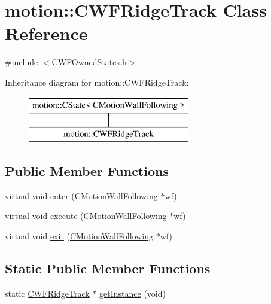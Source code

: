 \hypertarget{classmotion_1_1CWFRidgeTrack}{}\section{motion\+:\+:C\+W\+F\+Ridge\+Track Class Reference}
\label{classmotion_1_1CWFRidgeTrack}


{\ttfamily \#include $<$C\+W\+F\+Owned\+States.\+h$>$}

Inheritance diagram for motion\+:\+:C\+W\+F\+Ridge\+Track\+:\begin{figure}[H]
\begin{center}
\leavevmode
\includegraphics[height=2.000000cm]{classmotion_1_1CWFRidgeTrack}
\end{center}
\end{figure}
\subsection*{Public Member Functions}
\begin{DoxyCompactItemize}
\item 
virtual void \mbox{\hyperlink{classmotion_1_1CWFRidgeTrack_a216b8b7778464a2afd1a4f57da4317de}{enter}} (\mbox{\hyperlink{classmotion_1_1CMotionWallFollowing}{C\+Motion\+Wall\+Following}} $\ast$wf)
\item 
virtual void \mbox{\hyperlink{classmotion_1_1CWFRidgeTrack_a68b351694d461637ad97c5d657f3fbca}{execute}} (\mbox{\hyperlink{classmotion_1_1CMotionWallFollowing}{C\+Motion\+Wall\+Following}} $\ast$wf)
\item 
virtual void \mbox{\hyperlink{classmotion_1_1CWFRidgeTrack_a15ab958b412e2e6a70619822e6697f7f}{exit}} (\mbox{\hyperlink{classmotion_1_1CMotionWallFollowing}{C\+Motion\+Wall\+Following}} $\ast$wf)
\end{DoxyCompactItemize}
\subsection*{Static Public Member Functions}
\begin{DoxyCompactItemize}
\item 
static \mbox{\hyperlink{classmotion_1_1CWFRidgeTrack}{C\+W\+F\+Ridge\+Track}} $\ast$ \mbox{\hyperlink{classmotion_1_1CWFRidgeTrack_ad85de711d4ce2b59f3dca20d233d77ed}{get\+Instance}} (void)
\end{DoxyCompactItemize}



